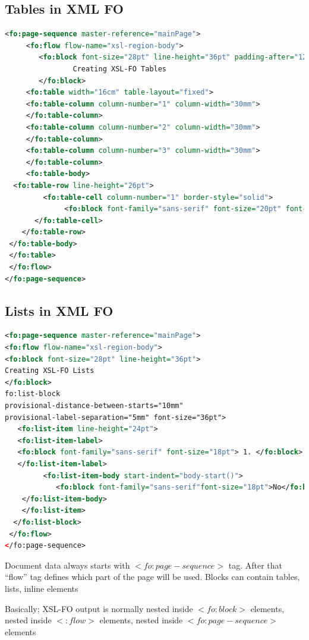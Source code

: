 \subsection{Tables in XML FO}
\begin{lstlisting}[language=xml]
<fo:page-sequence master-reference="mainPage">
     <fo:flow flow-name="xsl-region-body">
        <fo:block font-size="28pt" line-height="36pt" padding-after="12pt">
                Creating XSL-FO Tables
        </fo:block>
     <fo:table width="16cm" table-layout="fixed">
     <fo:table-column column-number="1" column-width="30mm">
     </fo:table-column>
     <fo:table-column column-number="2" column-width="30mm">
     </fo:table-column>
     <fo:table-column column-number="3" column-width="30mm">
     </fo:table-column>
     <fo:table-body>
  <fo:table-row line-height="26pt">
         <fo:table-cell column-number="1" border-style="solid">
              <fo:block font-family="sans-serif" font-size="20pt" font-weight="bold"> State</fo:block>
       </fo:table-cell>
    </fo:table-row>
 </fo:table-body>
 </fo:table>
 </fo:flow>
</fo:page-sequence>
\end{lstlisting}
\cite{informit} 
\subsection{Lists in XML FO}
\begin{lstlisting}[language=xml]
<fo:page-sequence master-reference="mainPage">
<fo:flow flow-name="xsl-region-body">
<fo:block font-size="28pt" line-height="36pt">
Creating XSL-FO Lists
</fo:block>
fo:list-block
provisional-distance-between-starts="10mm"
provisional-label-separation="5mm" font-size="36pt">
   <fo:list-item line-height="24pt">
   <fo:list-item-label>
   <fo:block font-family="sans-serif" font-size="18pt"> 1. </fo:block>
   </fo:list-item-label>
         <fo:list-item-body start-indent="body-start()">
            <fo:block font-family="sans-serif"font-size="18pt">No</fo:block>
    </fo:list-item-body>
    </fo:list-item>
  </fo:list-block>
 </fo:flow>
</fo:page-sequence>
\end{lstlisting}

Document data always starts with $<fo:page-sequence>$ tag. After that “flow” tag defines which part of the page will be used. Blocks can contain tables, lists, inline elements

Basically; XSL-FO output is normally nested inside $<fo:block>$ elements, nested inside $<:flow>$ elements, nested inside $<fo:page-sequence>$ elements 